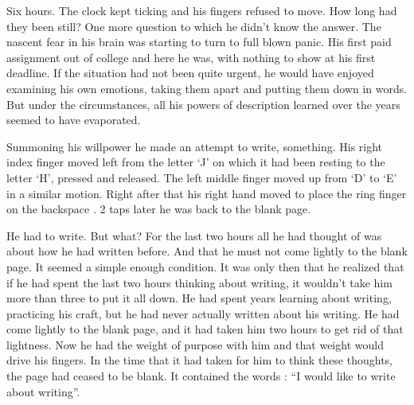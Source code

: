 \documentclass[11pt,letterpaper]{article}
\begin{document}
Six hours. The clock kept ticking and his fingers refused to move. How long had they been still? One more question to which he didn't know the answer. The nascent fear in his brain was starting to turn to full blown panic. His first paid assignment out of college and here he was, with nothing to show at his first deadline. If the situation had not been quite urgent, he would have enjoyed examining his own emotions, taking them apart and putting them down in words. But under the circumstances, all his powers of description learned over the years seemed to have evaporated.

Summoning his willpower he made an attempt to write, something. His right index finger moved left from the letter `J' on which it had been resting to the letter `H', pressed and released. The left middle finger moved up from `D' to `E' in a similar motion. Right after that his right hand moved to place the ring finger on the backspace . 2 taps later he was back to the blank page.

He had to write. But what? For the last two hours all he had thought of was about how he had written before. And that he must not come lightly to the blank page. It seemed a simple enough condition. It was only then that he realized that if he had spent the last two hours thinking about writing, it wouldn't take him more than three to put it all down. He had spent years learning about writing, practicing his craft, but he had never actually written about his writing. He had come lightly to the blank page, and it had taken him two hours to get rid of that lightness. Now he had the weight of purpose with him and that weight would drive his fingers. In the time that it had taken for him to think these thoughts, the page had ceased to be blank. It contained the words : ``I would like to write about writing''.
\end{document}

